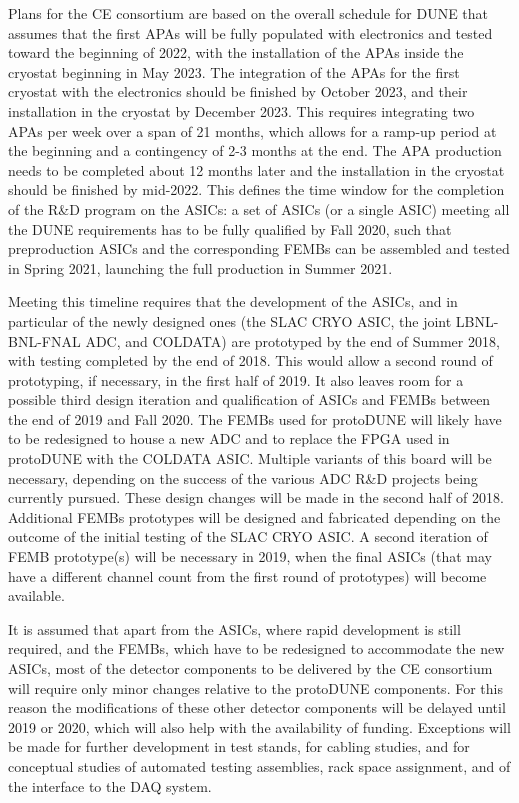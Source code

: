 Plans for the CE consortium are based on the overall schedule for DUNE
that assumes that the first APAs will be fully populated with electronics
and tested toward the beginning of 2022, with the installation of
the APAs inside the cryostat beginning in May 2023. The integration of the
APAs for the first cryostat with the electronics should be finished by
October 2023, and their installation in the cryostat by December 2023.
This requires integrating two APAs per week over a span of 21 months,
which allows for a ramp-up period at the beginning and a contingency of
2-3 months at the end. The APA production needs to be completed
about 12 months later and the installation in the cryostat should be
finished by mid-2022. This defines the time window for the completion of
the R\&D program on the ASICs: a set of ASICs (or a single ASIC) meeting
all the DUNE requirements has to be fully qualified by Fall 2020, such
that preproduction ASICs and the corresponding FEMBs can be assembled and
tested in Spring 2021, launching the full production in Summer 2021.

Meeting this timeline requires that the development of the ASICs, and in particular
of the newly designed ones (the SLAC CRYO ASIC, the joint LBNL-BNL-FNAL ADC,
and COLDATA) are prototyped by the end of Summer 2018, with testing
completed by the end of 2018. This would allow a second round of prototyping,
if necessary, in the first half of 2019. It also leaves room for a possible
third design iteration and qualification of ASICs and FEMBs between the
end of 2019 and Fall 2020. The FEMBs used for protoDUNE will
likely have to be redesigned to house a new ADC and to replace the FPGA used
in protoDUNE with the COLDATA ASIC. Multiple variants of this board will be
necessary, depending on the success of the various ADC R\&D projects being currently
pursued. These design changes will be made in the second half of 2018.
Additional FEMBs prototypes will be designed and fabricated depending on
the outcome of the initial testing of the SLAC CRYO ASIC. A second iteration
of FEMB prototype(s) will be necessary in 2019, when the final ASICs (that
may have a different channel count from the first round of prototypes) will become
available.

It is assumed that apart from the ASICs, where rapid development is still
required, and the FEMBs, which have to be redesigned to accommodate the
new ASICs, most of the detector components to be delivered by the CE consortium
will require only minor changes relative to the protoDUNE components. For
this reason the modifications of these other detector components will
be delayed until 2019 or 2020, which will also help with the availability of funding.
Exceptions will be made for further development in test stands, for cabling
studies, and for conceptual studies of automated testing assemblies, rack space
assignment, and of the interface to the DAQ system.

